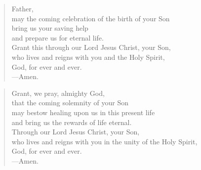 \prayer

\setlength{\vleftmargin}{\prayerleftmargini}

\begin{verse}
Father,\\
may the coming celebration of the birth of your Son\\
bring us your saving help\\
and prepare us for eternal life.\\
Grant this through our Lord Jesus Christ, your Son,\\
who lives and reigns with you and the Holy Spirit,\\
God, for ever and ever.\\
{\color{red}---\thinspace}Amen.
\end{verse}


\begin{verse}
Grant, we pray, almighty God,\\
 that the coming solemnity of your Son\\
may bestow healing upon us in this present life\\
and bring us the rewards of life eternal.\\
Through our Lord Jesus Christ, your Son,\\
 who lives and reigns with you in the unity of the Holy Spirit,\\
God, for ever and ever.\\
{\color{red}---\thinspace}Amen.
\end{verse}

\setlength{\vleftmargin}{\defleftmargini}